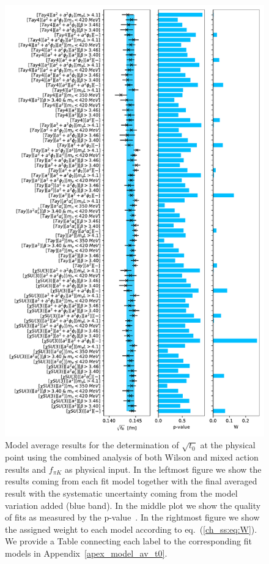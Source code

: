 {\begin{figure}
    \centering
    \includegraphics[width=1.\textwidth]{./cap5/figs/BMA_comb.pdf}
    \caption{Model average results for the determination of $\sqrt{t_0}$ at the physical point using the combined analysis of both Wilson and mixed action results and $f_{\pi K}$ as physical input. In the leftmost figure we show the results coming from each fit model together with the final averaged result with the systematic uncertainty coming from the model variation added (blue band). In the middle plot we show the quality of fits as measured by the p-value~\citep{Bruno:2022mfy}. In the rightmost figure we show the assigned weight to each model according to eq.~(\ref{ch_ss:eq:W}). We provide a Table connecting each label to the corresponding fit models in Appendix~\ref{apex_model_av_t0}.}
    \label{ch_ss:fig:BMA_comb}
\end{figure}

}
